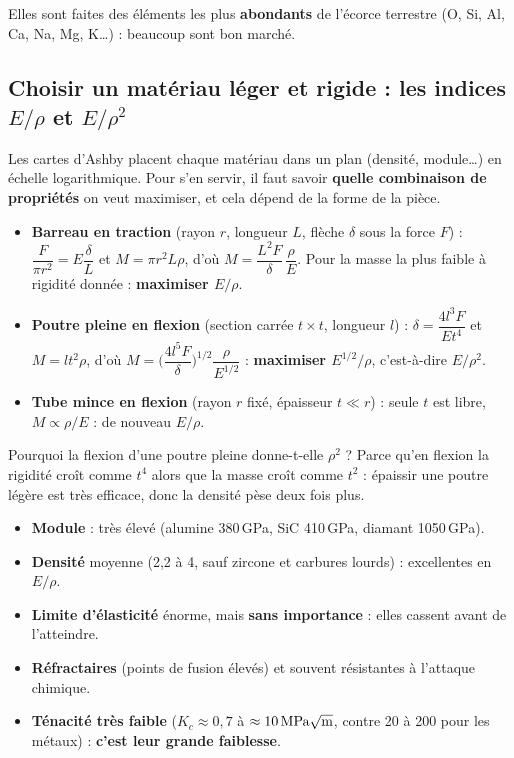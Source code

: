 Elles sont faites des éléments les plus \textbf{abondants} de l'écorce terrestre (O, Si, Al,
Ca, Na, Mg, K\ldots) : beaucoup sont bon marché.

\subsection*{Choisir un matériau léger et rigide : les indices $E/\rho$ et $E/\rho^2$}

Les cartes d'Ashby placent chaque matériau dans un plan (densité, module\ldots) en échelle
logarithmique. Pour s'en servir, il faut savoir \textbf{quelle combinaison de propriétés} on
veut maximiser, et cela dépend de la forme de la pièce.

\begin{itemize}
  \item \textbf{Barreau en traction} (rayon $r$, longueur $L$, flèche $\delta$ sous la force $F$) :
        $\dfrac{F}{\pi r^2} = E\dfrac{\delta}{L}$ et $M = \pi r^2 L\rho$, d'où
        $M = \dfrac{L^2 F}{\delta}\,\dfrac{\rho}{E}$. Pour la masse la plus faible à rigidité
        donnée : \textbf{maximiser $E/\rho$}.
  \item \textbf{Poutre pleine en flexion} (section carrée $t\times t$, longueur $l$) :
        $\delta = \dfrac{4l^3F}{Et^4}$ et $M = lt^2\rho$, d'où
        $M = \Big(\dfrac{4l^5F}{\delta}\Big)^{1/2}\dfrac{\rho}{E^{1/2}}$ :
        \textbf{maximiser $E^{1/2}/\rho$}, c'est-à-dire $E/\rho^2$.
  \item \textbf{Tube mince en flexion} (rayon $r$ fixé, épaisseur $t \ll r$) : seule $t$ est
        libre, $M \propto \rho/E$ : de nouveau \textbf{$E/\rho$}.
\end{itemize}

Pourquoi la flexion d'une poutre pleine donne-t-elle $\rho^2$ ? Parce qu'en flexion la rigidité
croît comme $t^4$ alors que la masse croît comme $t^2$ : épaissir une poutre légère est très
efficace, donc la densité \og pèse\fg{} deux fois plus.


\begin{propbox}[title=Ce que disent les cartes]
\begin{itemize}
  \item \textbf{Module} : très élevé (alumine 380\,GPa, SiC 410\,GPa, diamant 1050\,GPa).
  \item \textbf{Densité} moyenne (2,2 à 4, sauf zircone et carbures lourds) : excellentes en
        $E/\rho$.
  \item \textbf{Limite d'élasticité} énorme, mais \textbf{sans importance} : elles cassent
        avant de l'atteindre.
  \item \textbf{Réfractaires} (points de fusion élevés) et souvent résistantes à l'attaque
        chimique.
  \item \textbf{Ténacité très faible} ($K_c \approx 0{,}7$ à $\approx 10\,\text{MPa}\sqrt{\text m}$,
        contre 20 à 200 pour les métaux) : \textbf{c'est leur grande faiblesse}.
\end{itemize}
\end{propbox}

